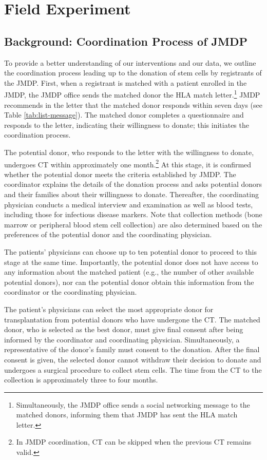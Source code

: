 \documentclass[12pt, a4paper]{article}
\begin{document}
\hypertarget{experiment}{%
\section{Field Experiment}\label{experiment}}

\hypertarget{background}{%
\subsection{Background: Coordination Process of JMDP}\label{background}}

To provide a better understanding of our interventions and our data, we outline the coordination process leading up to the donation of stem cells by registrants of the JMDP. First, when a registrant is matched with a patient enrolled in the JMDP, the JMDP office sends the matched donor the HLA match letter.\footnote{Simultaneously, the JMDP office sends a social networking message to the matched donors, informing them that JMDP has sent the HLA match letter.} JMDP recommends in the letter that the matched donor responds within seven days (see Table \ref{tab:list-message}). The matched donor completes a questionnaire and responds to the letter, indicating their willingness to donate; this initiates the coordination process.

The potential donor, who responds to the letter with the willingness to donate, undergoes CT within approximately one month.\footnote{In JMDP coordination, CT can be skipped when the previous CT remains valid.} At this stage, it is confirmed whether the potential donor meets the criteria established by JMDP. The coordinator explains the details of the donation process and asks potential donors and their families about their willingness to donate. Thereafter, the coordinating physician conducts a medical interview and examination as well as blood tests, including those for infectious disease markers. Note that collection methods (bone marrow or peripheral blood stem cell collection) are also determined based on the preferences of the potential donor and the coordinating physician.

The patients' physicians can choose up to ten potential donor to proceed to this stage at the same time. Importantly, the potential donor does not have access to any information about the matched patient (e.g., the number of other available potential donors), nor can the potential donor obtain this information from the coordinator or the coordinating physician.

The patient's physicians can select the most appropriate donor for transplantation from potential donors who have undergone the CT. The matched donor, who is selected as the best donor, must give final consent after being informed by the coordinator and coordinating physician. Simultaneously, a representative of the donor's family must consent to the donation. After the final consent is given, the selected donor cannot withdraw their decision to donate and undergoes a surgical procedure to collect stem cells. The time from the CT to the collection is approximately three to four months.
\end{document}
